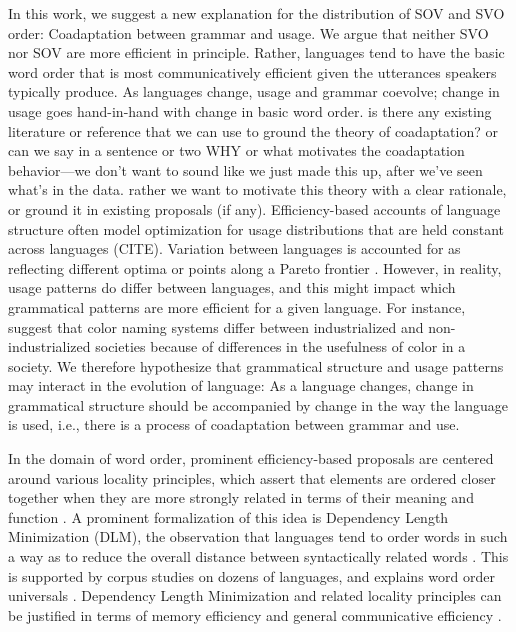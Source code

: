 \documentclass[11pt,a4paper]{article}
\newcommand\comment[1]{{\color{red}#1}}
\begin{document}
In this work, we suggest a new explanation for the distribution of SOV and SVO order:
{Coadaptation} between grammar and usage.
We argue that neither SVO nor SOV are more efficient in principle.
Rather, languages tend to have the basic word order that is most communicatively efficient given the utterances speakers typically produce.
As languages change, usage and grammar coevolve; change in usage goes hand-in-hand with change in basic word order.
\comment{is there any existing literature or reference that we can use to ground the theory of coadaptation? or can we say in a sentence or two WHY or what motivates the coadaptation behavior---we don't want to sound like we just made this up, after we've seen what's in the data. rather we want to motivate this theory with a clear rationale, or ground it in existing proposals (if any).}
Efficiency-based accounts of language structure often model optimization for usage distributions that are held constant across languages (CITE).
Variation between languages is accounted for as reflecting different optima or points along a Pareto frontier \citep{zaslavsky2018efficient, zaslavsky2019evolution}.
However, in reality, usage patterns do differ between languages, and this might impact which grammatical patterns are more efficient for a given language.
For instance, \cite{gibson2017color} suggest that color naming systems differ between industrialized and non-industrialized societies because of differences in the usefulness of color in a society.
We therefore hypothesize that grammatical structure and usage patterns may interact in the evolution of language:
As a language changes, change in grammatical structure should be accompanied by change in the way the language is used, i.e., there is a process of {coadaptation} between grammar and use.

In the domain of word order, prominent efficiency-based proposals are centered around various locality principles, which assert that elements are ordered closer together when they are more strongly related in terms of their meaning and function \citep{behaghel1932deutsche,givon1985iconicity,rijkhoff-word-1986,hawkins-performance-1994}.
A prominent formalization of this idea is {Dependency Length Minimization} (DLM), the observation that languages tend to order words in such a way as to reduce the overall distance between syntactically related words \citep{rijkhoff-word-1986,hawkins-performance-1994,futrell-cross-linguistic-2015, liu-dependency-2017}.
This is supported by corpus studies on dozens of languages, and explains word order universals \citep{rijkhoff-word-1986, hawkins-performance-1994, hahn2020universals}.
Dependency Length Minimization and related locality principles can be justified in terms of memory efficiency \citep{gibson-linguistic-1998} and general communicative efficiency \citep{hahn2020universals}.
\end{document}
